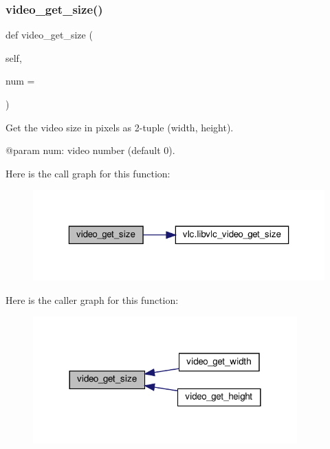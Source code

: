 \subsubsection{\texorpdfstring{video\+\_\+get\+\_\+size()}{video\_get\_size()}}
{\footnotesize\ttfamily def video\+\_\+get\+\_\+size (\begin{DoxyParamCaption}\item[{}]{self,  }\item[{}]{num = {} }\end{DoxyParamCaption})}

\begin{DoxyVerb}Get the video size in pixels as 2-tuple (width, height).

@param num: video number (default 0).
\end{DoxyVerb}
 Here is the call graph for this function\+:
\nopagebreak
\begin{figure}[H]
\begin{center}
\leavevmode
\includegraphics[width=323pt]{classvlc_1_1_media_player_a510a2f0ec76549207198544715c65783_cgraph}
\end{center}
\end{figure}
Here is the caller graph for this function\+:
\nopagebreak
\begin{figure}[H]
\begin{center}
\leavevmode
\includegraphics[width=288pt]{classvlc_1_1_media_player_a510a2f0ec76549207198544715c65783_icgraph}
\end{center}
\end{figure}
\mbox{\label{classvlc_1_1_media_player_ae9a4f3a68dcd0bbb7d630ba3109fd378}} 
